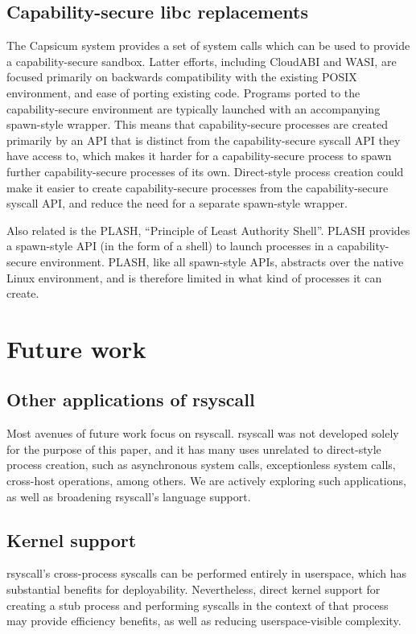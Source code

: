 \documentclass[sigplan]{acmart}
\begin{document}
\subsection{Capability-secure libc replacements}
The Capsicum system provides a set of system calls
which can be used to provide a capability-secure sandbox.\cite{capsicum}
Latter efforts\cite{oblivious}, including CloudABI\cite{cloudabi} and WASI\cite{wasi},
are focused primarily on backwards compatibility with the existing POSIX environment, and ease of porting existing code.
Programs ported to the capability-secure environment
are typically launched with an accompanying spawn-style wrapper.
This means that capability-secure processes are created primarily by an API
that is distinct from the capability-secure syscall API they have access to,
which makes it harder for a capability-secure process to spawn further capability-secure processes of its own.
Direct-style process creation could make it easier to create capability-secure processes 
from the capability-secure syscall API,
and reduce the need for a separate spawn-style wrapper.

Also related is the PLASH, ``Principle of Least Authority Shell''\cite{plash}.
PLASH provides a spawn-style API (in the form of a shell)
to launch processes in a capability-secure environment.
PLASH, like all spawn-style APIs, abstracts over the native Linux environment,
and is therefore limited in what kind of processes it can create.
\section{Future work}\label{future_work}
\subsection{Other applications of rsyscall}
Most avenues of future work focus on rsyscall.
rsyscall was not developed solely for the purpose of this paper,
and it has many uses unrelated to direct-style process creation,
such as asynchronous system calls, exceptionless system calls\cite{flexsc}, cross-host operations, among others.
We are actively exploring such applications,
as well as broadening rsyscall's language support.
\subsection{Kernel support}
rsyscall's cross-process syscalls can be performed entirely in userspace,
which has substantial benefits for deployability.
Nevertheless, direct kernel support for creating a stub process and performing syscalls in the context of that process
may provide efficiency benefits, as well as reducing userspace-visible complexity.
\end{document}
